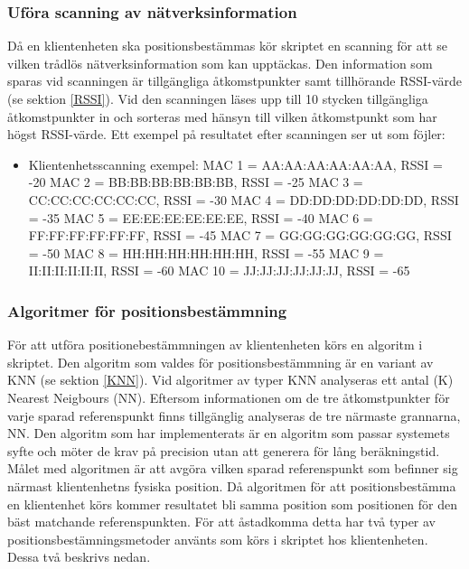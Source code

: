 \documentclass[swedish, a4paper,12pt]{article}
\begin{document}
\subsubsection{Uföra scanning av nätverksinformation} \label{scanning}
Då en klientenheten ska positionsbestämmas kör skriptet en scanning för att se vilken trådlös nätverksinformation som kan upptäckas. Den information som sparas vid scanningen är tillgängliga åtkomstpunkter samt tillhörande RSSI-värde (se sektion \ref{RSSI}). Vid den scanningen läses upp till 10 stycken tillgängliga åtkomstpunkter %
in och sorteras med hänsyn till vilken åtkomstpunkt som har högst RSSI-värde. Ett exempel på resultatet efter scanningen ser ut som föjler:

  \begin{itemize}
  \item Klientenhetsscanning exempel:
        \newline MAC 1 = AA:AA:AA:AA:AA:AA,  RSSI = -20
        \newline MAC 2 = BB:BB:BB:BB:BB:BB,  RSSI = -25
        \newline MAC 3 = CC:CC:CC:CC:CC:CC,  RSSI = -30
        \newline MAC 4 = DD:DD:DD:DD:DD:DD,  RSSI = -35
        \newline MAC 5 = EE:EE:EE:EE:EE:EE,  RSSI = -40
        \newline MAC 6 = FF:FF:FF:FF:FF:FF,  RSSI = -45
        \newline MAC 7 = GG:GG:GG:GG:GG:GG,  RSSI = -50
        \newline MAC 8 = HH:HH:HH:HH:HH:HH,  RSSI = -55
        \newline MAC 9 = II:II:II:II:II:II,  RSSI = -60
        \newline MAC 10 = JJ:JJ:JJ:JJ:JJ:JJ,  RSSI = -65
  \end{itemize}

\subsubsection{Algoritmer för positionsbestämmning}
För att utföra positionebestämmningen av klientenheten körs en algoritm i skriptet. Den algoritm som valdes för positionsbestämmning är en variant av KNN (se sektion \ref{KNN}). Vid algoritmer av typer KNN analyseras ett antal (K) Nearest Neigbours (NN). Eftersom informationen om de tre åtkomstpunkter för varje sparad referenspunkt finns tillgänglig analyseras de tre närmaste grannarna, NN. %
Den algoritm som har implementerats är en algoritm som passar systemets syfte och möter de krav på precision utan att generera för lång beräkningstid. Målet med algoritmen är att avgöra vilken sparad referenspunkt som befinner sig närmast klientenhetns fysiska position. Då algoritmen för att positionsbestämma en klientenhet körs kommer resultatet bli samma position som positionen för den bäst matchande referenspunkten. För att åstadkomma detta har två typer av positionsbestämningsmetoder använts som körs i skriptet hos klientenheten. Dessa två beskrivs nedan.
\end{document}
